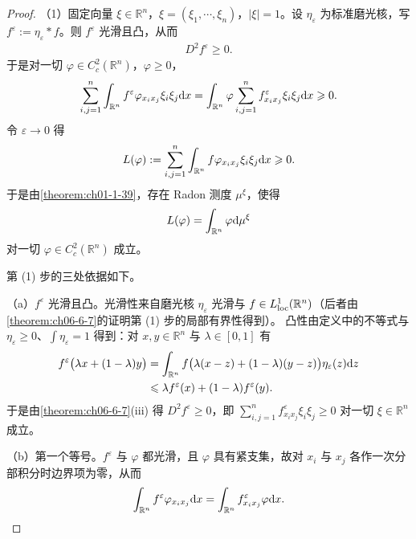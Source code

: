 \documentclass[../../main.tex]{subfiles}%
\begin{document}
\begin{proof}
（1）固定向量 $\xi\in\mathbb{R}^n$，$\xi=(\xi_1,\cdots,\xi_n)$，$\lvert\xi\rvert=1$。设 $\eta_{\varepsilon}$ 为标准磨光核，写 $f^{\varepsilon}:=\eta_{\varepsilon}*f$。则 $f^{\varepsilon}$ 光滑且凸，从而
\begin{align*}
D^{2}f^{\varepsilon}\geqslant0 .
\end{align*}
于是对一切 $\varphi\in C_c^{2}(\mathbb{R}^n)$，$\varphi\geqslant0$，
\begin{align*}
\sum_{i,j=1}^{n}\int_{\mathbb{R}^n}f^{\varepsilon}\varphi_{x_ix_j}\xi_i\xi_j\mathrm{d} x=\int_{\mathbb{R}^n}\varphi\sum_{i,j=1}^{n}f^{\varepsilon}_{x_ix_j}\xi_i\xi_j\mathrm{d} x\geqslant0 .
\end{align*}
令 $\varepsilon\to0$ 得
\begin{align*}
L(\varphi):=\sum_{i,j=1}^{n}\int_{\mathbb{R}^n}f\varphi_{x_ix_j}\xi_i\xi_j\mathrm{d} x\geqslant0 .
\end{align*}
于是由\cref{theorem:ch01-1-39}，存在 Radon 测度 $\mu^{\xi}$，使得%
\begin{align*}
L(\varphi)=\int_{\mathbb{R}^n}\varphi\mathrm{d}\mu^{\xi}
\end{align*}
对一切 $\varphi\in C_c^{2}(\mathbb{R}^n)$ 成立。

第 (1) 步的三处依据如下。

（a）$f^{\varepsilon}$ 光滑且凸。光滑性来自磨光核 $\eta_{\varepsilon}$ 光滑与 $f\in L^{1}_{\mathrm{loc}}(\mathbb{R}^n)$（后者由\cref{theorem:ch06-6-7}的证明第 (1) 步的局部有界性得到）。%
凸性由定义中的不等式与 $\eta_{\varepsilon}\geqslant0$、$\int\eta_{\varepsilon}=1$ 得到：对 $x,y\in\mathbb{R}^n$ 与 $\lambda\in[0,1]$ 有
\begin{align*}
f^{\varepsilon}\bigl(\lambda x+(1-\lambda)y\bigr)
&=\int_{\mathbb{R}^n}f\bigl(\lambda(x-z)+(1-\lambda)(y-z)\bigr)\eta_{\varepsilon}(z)\mathrm{d} z\\
&\leqslant\lambda f^{\varepsilon}(x)+(1-\lambda)f^{\varepsilon}(y).
\end{align*}
于是由\cref{theorem:ch06-6-7}(iii) 得 $D^{2}f^{\varepsilon}\geqslant0$，即 $\sum_{i,j=1}^{n}f^{\varepsilon}_{x_ix_j}\xi_i\xi_j\geqslant0$ 对一切 $\xi\in\mathbb{R}^n$ 成立。%

（b）第一个等号。$f^{\varepsilon}$ 与 $\varphi$ 都光滑，且 $\varphi$ 具有紧支集，故对 $x_i$ 与 $x_j$ 各作一次分部积分时边界项为零，从而
\begin{align*}
\int_{\mathbb{R}^n}f^{\varepsilon}\varphi_{x_ix_j}\mathrm{d} x=\int_{\mathbb{R}^n}f^{\varepsilon}_{x_ix_j}\varphi\mathrm{d} x .
\end{align*}


\end{proof}
\end{document}
